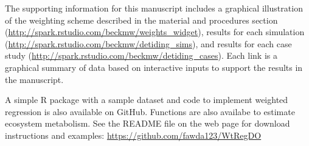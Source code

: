 The supporting information for this manuscript includes a graphical illustration of the weighting scheme described in the material and procedures section (\href{http://spark.rstudio.com/beckmw/weights_widget}{http://spark.rstudio.com/beckmw/weights\_widget}), results for each simulation (\href{http://spark.rstudio.com/beckmw/detiding_sims}{http://spark.rstudio.com/beckmw/detiding\_sims}), and results for each case study (\href{http://spark.rstudio.com/beckmw/detiding_cases}{http://spark.rstudio.com/beckmw/detiding\_cases}).  Each link is a graphical summary of data based on interactive inputs to support the results in the manuscript.

A simple R package with a sample dataset and code to implement weighted regression is also available on GitHub.  Functions are also availabe to estimate ecosystem metabolism.  See the README file on the web page for download instructions and examples: \href{https://github.com/fawda123/WtRegDO}{https://github.com/fawda123/WtRegDO}